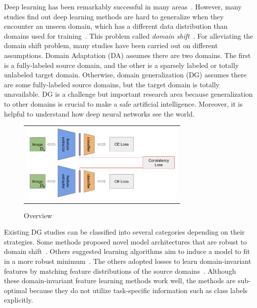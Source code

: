 Deep learning has been remarkably successful in many areas~\cite{Girshick2014, Krizhevsky2012, Ren2017, Shelhamer2017}. However, many studies find out deep learning methods are hard to generalize when they encounter an unseen domain, which has a different data distribution than domains used for training~\cite{Li2018MLDG, Li2017dg, Li2018MLDG, shankar2018generalizing, ganin2015unsupervised, bousmalis2016domain, motiian2017CCSA}. This problem called \textit{domain shift}~\cite{Shimodaira2000}. For alleviating the domain shift problem, many studies have been carried out on different assumptions. Domain Adaptation (DA) assumes there are two domains. The first is a fully-labeled source domain, and the other is a sparsely labeled or totally unlabeled target domain. Otherwise, domain generalization (DG) assumes there are some fully-labeled source domains, but the target domain is totally unavailable. DG is a challenge but important research area because generalization to other domains is crucial to make a safe artificial intelligence. Moreover, it is helpful to understand how deep neural networks see the world.

\begin{figure}[t]
	\centering
	\footnotesize
	\begin{tabular}{c}
		\includegraphics[width=8cm]{figures/model.png}
	\end{tabular}
	\caption{Overview}\label{fig:overview}
\end{figure}

Existing DG studies can be classified into several categories depending on their strategies. Some methods proposed novel model architectures that are robust to domain shift~\cite{Khosla12undobias, Li2017dg}. Others suggested learning algorithms aim to induce a model to fit in a more robust minimum~\cite{li2019episodic, Li2018MLDG, NIPS2018_metareg}. The others adopted losses to learn domain-invariant features by matching feature distributions of the source domains~\cite{Ghifary2015mtae, muandet2013domaingeneralization, mmdaaecvpr2018}. Although these domain-invariant feature learning methods work well, the methods are sub-optimal because they do not utilize task-specific information such as class labels explicitly. 

